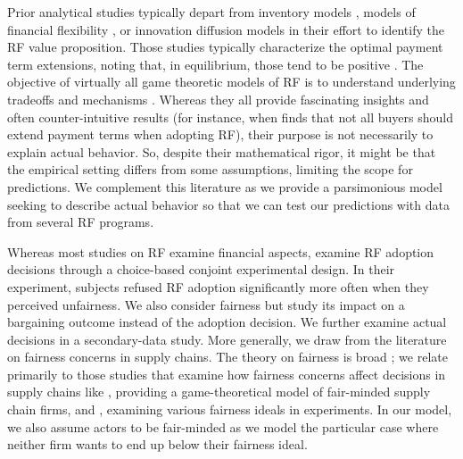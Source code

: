 \documentclass[a4paper,11pt]{article}
\renewcommand{\~}[1]{\tilde{#1}}
\renewcommand{\-}[1]{\overline{#1}}
\begin{document}
Prior analytical studies typically depart from inventory models \citep{Lekkakos2016,Kouvelis2020,Tanrisever2012,vanderVliet2015}, models of financial flexibility \citep{Grueter2017,Hu2018}, or innovation diffusion models \citep{DelloIacono2015, Wuttke2016} in their effort to identify the RF value proposition. Those studies typically characterize the optimal payment term extensions, noting that, in equilibrium, those tend to be positive \citep{Hu2018,Lekkakos2016}. The objective of virtually all game theoretic models of RF is to understand underlying tradeoffs and mechanisms \citep{Grueter2017, Hu2018, Kouvelis2020, Lekkakos2016, Tanrisever2012, vanderVliet2015, Wuttke2016}. Whereas they all provide fascinating insights and often counter-intuitive results (for instance, when \citet{Kouvelis2020} finds that not all buyers should extend payment terms when adopting RF), their purpose is not necessarily to explain actual behavior. So, despite their mathematical rigor, it might be that the empirical setting differs from some assumptions, limiting the scope for predictions. We complement this literature as we provide a parsimonious model seeking to describe actual behavior so that we can test our predictions with data from several RF programs. 

Whereas most studies on RF examine financial aspects, \citet{banerjee2021} examine RF adoption decisions through a choice-based conjoint experimental design. In their experiment, subjects refused RF adoption significantly more often when they perceived unfairness. We also consider fairness but study its impact on a bargaining outcome instead of the adoption decision. We further examine actual decisions in a secondary-data study. More generally, we draw from the literature on fairness concerns in supply chains. The theory on fairness is broad \citep[see][]{Fehr1999}; we relate primarily to those studies that examine how fairness concerns affect decisions in supply chains like \citet{Cui2007}, providing a game-theoretical model of fair-minded supply chain firms, and \citet{Cappelen2007}, examining various fairness ideals in experiments. In our model, we also assume actors to be fair-minded as we model the particular case where neither firm wants to end up below their fairness ideal.
\end{document}
